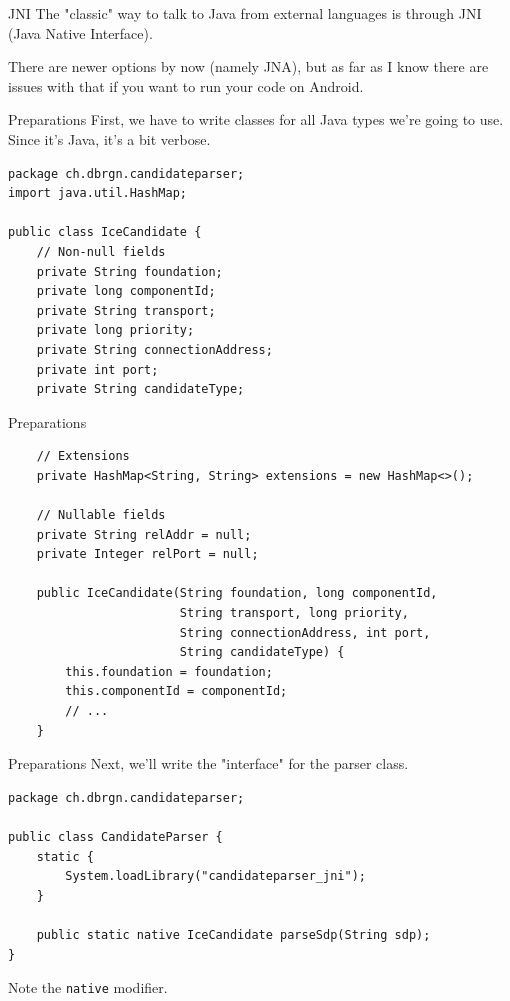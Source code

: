 \documentclass[aspectratio=1610,14pt,t]{beamer}
\begin{document}
\begin{frame}[c]{JNI}
  The "classic" way to talk to Java from external languages is through JNI (Java
  Native Interface).

  There are newer options by now (namely JNA), but as far as I know there are
  issues with that if you want to run your code on Android.
\end{frame}

\begin{frame}[c,fragile]{Preparations}
  First, we have to write classes for all Java types we're going to use. Since
  it's Java, it's a bit verbose.

  \begin{verbatim}
package ch.dbrgn.candidateparser;
import java.util.HashMap;

public class IceCandidate {
    // Non-null fields
    private String foundation;
    private long componentId;
    private String transport;
    private long priority;
    private String connectionAddress;
    private int port;
    private String candidateType;
  \end{verbatim}
\end{frame}

\begin{frame}[c,fragile]{Preparations}
  \begin{verbatim}
    // Extensions
    private HashMap<String, String> extensions = new HashMap<>();

    // Nullable fields
    private String relAddr = null;
    private Integer relPort = null;

    public IceCandidate(String foundation, long componentId,
                        String transport, long priority,
                        String connectionAddress, int port,
                        String candidateType) {
        this.foundation = foundation;
        this.componentId = componentId;
        // ...
    }

  \end{verbatim}
\end{frame}

\begin{frame}[c,fragile]{Preparations}
  Next, we'll write the "interface" for the parser class.

  \begin{verbatim}
package ch.dbrgn.candidateparser;

public class CandidateParser {
    static {
        System.loadLibrary("candidateparser_jni");
    }

    public static native IceCandidate parseSdp(String sdp);
}
  \end{verbatim}

Note the \texttt{native} modifier.
\end{frame}
\end{document}
